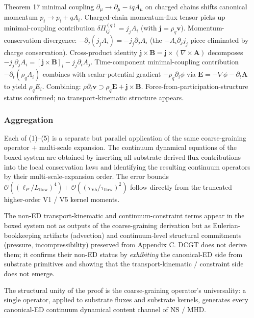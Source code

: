 \documentclass[
  11pt,a4paper]{article}
\begin{document}
Theorem 17 minimal coupling \(\partial_\mu \to \partial_\mu - iqA_\mu\)
on charged chains shifts canonical momentum \(p_i \to p_i + qA_i\).
Charged-chain momentum-flux tensor picks up minimal-coupling
contribution \(\delta\Pi^{(q)}_{ij} = j_j A_i\) (with
\(\mathbf{j} = \rho_q\mathbf{v}\)). Momentum-conservation divergence:
\(-\partial_j(j_jA_i) = -j_j\partial_jA_i\) (the \(-A_i\partial_j j_j\)
piece eliminated by charge conservation). Cross-product identity
\(\mathbf{j}\times\mathbf{B} = \mathbf{j}\times(\nabla\times\mathbf{A})\)
decomposes
\(-j_j\partial_jA_i = [\mathbf{j}\times\mathbf{B}]_i - j_j\partial_iA_j\).
Time-component minimal-coupling contribution \(-\partial_t(\rho_qA_i)\)
combines with scalar-potential gradient \(-\rho_q\partial_i\phi\) via
\(\mathbf{E} = -\nabla\phi - \partial_t\mathbf{A}\) to yield
\(\rho_qE_i\). Combining:
\(\rho\partial_t\mathbf{v} \supset \rho_q\mathbf{E} + \mathbf{j}\times\mathbf{B}\).
Force-from-participation-structure status confirmed; no
transport-kinematic structure appears.

\subsubsection{Aggregation}\label{aggregation}

Each of (1)--(5) is a separate but parallel application of the same
coarse-graining operator + multi-scale expansion. The continuum
dynamical equations of the boxed system are obtained by inserting all
substrate-derived flux contributions into the local conservation laws
and identifying the resulting continuum operators by their
multi-scale-expansion order. The error bounds
\(\mathcal{O}((\ell_P/L_\mathrm{flow})^4) + \mathcal{O}((\tau_\mathrm{V5}/\tau_\mathrm{flow})^2)\)
follow directly from the truncated higher-order V1 / V5 kernel moments.

The non-ED transport-kinematic and continuum-constraint terms appear in
the boxed system not as outputs of the coarse-graining derivation but as
Eulerian-bookkeeping artifacts (advection) and continuum-level
structural commitments (pressure, incompressibility) preserved from
Appendix C. DCGT does not derive them; it confirms their non-ED status
by \emph{exhibiting} the canonical-ED side from substrate primitives and
showing that the transport-kinematic / constraint side does not emerge.

The structural unity of the proof is the coarse-graining operator's
universality: a single operator, applied to substrate fluxes and
substrate kernels, generates every canonical-ED continuum dynamical
content channel of NS / MHD.
\end{document}
